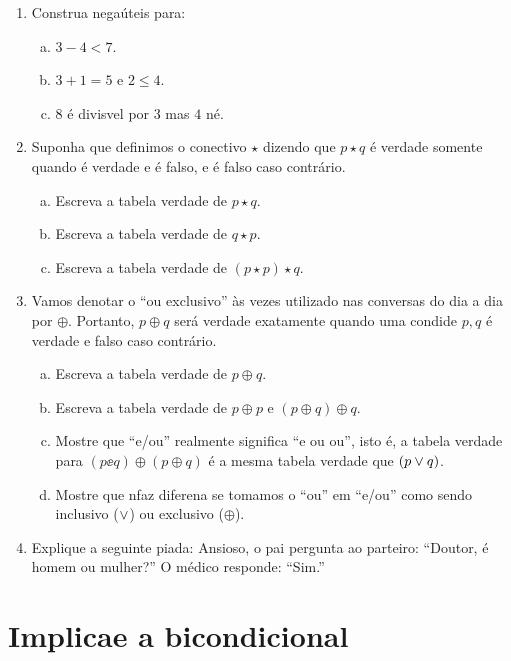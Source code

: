 \begin{enumerate}[{\bf 1.}]
\item Construa nega\coes \'uteis para:
\begin{enumerate}[a)]
\item $3-4<7$.
\item $3+1=5$ e $2 \leq 4$.
\item $8$ \'e divis\ih vel por 3 mas $4$ n\ao \'e.
\end{enumerate}

\item Suponha que definimos o conectivo $\star$ dizendo que $p \star q$ \'e verdade somente quando \qq \'e verdade e \pp \'e falso, e \'e falso caso contr\'ario.
\begin{enumerate}[a)]
\item Escreva a tabela verdade de $p \star q$. 
\item Escreva a tabela verdade de $q \star p$.
\item Escreva a tabela verdade de $(p \star p) \star q$.
\end{enumerate}

\item Vamos denotar o ``ou exclusivo'' \`as vezes utilizado nas conversas do dia a dia por $\oplus$. Portanto, $p\oplus q$ ser\'a verdade exatamente quando uma condi\cao de $p,q$ \'e verdade e falso caso contr\'ario.
\begin{enumerate}[a)]
\item Escreva a tabela verdade de $p \oplus q$.
\item Escreva a tabela verdade de $p \oplus p$ e $(p \oplus q) \oplus q$.
\item Mostre que ``e/ou'' realmente significa ``e ou ou'', isto \'e, a tabela verdade para $(p \ee q)\oplus(p \oplus q)$ \'e a mesma tabela verdade que $(p \vee q)$.
\item Mostre que n\ao faz diferen\cc a se tomamos o ``ou'' em ``e/ou'' como sendo inclusivo ($\vee$) ou exclusivo ($\oplus$).
\end{enumerate}

\item Explique a seguinte piada: Ansioso, o pai pergunta ao parteiro: ``Doutor, \'e homem ou mulher?'' O m\'edico responde: ``Sim.''
\end{enumerate}

\section{Implica\cao e a bicondicional}\label{implicacao}

